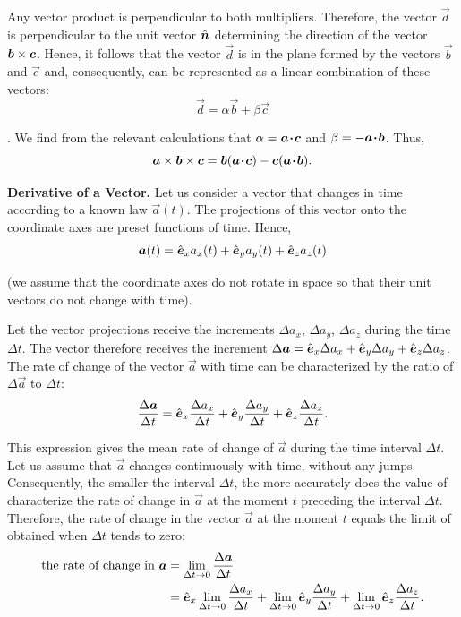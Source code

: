 \noindent
Any vector product is perpendicular to both multipliers. Therefore, the vector $\vec{d}$ is perpendicular to the unit vector $\hat{\boldsymbol{n}}$ determining the direction of the vector $\boldsymbol{b}\times\boldsymbol{c}$. Hence, it follows that the vector $\vec{d}$ is in the plane formed by the vectors $\vec{b}$ and $\vec{c}$ and, consequently, can be represented as a linear combination of these vectors:
\begin{equation*}
\vec{d} = \alpha\vec{b} + \beta\vec{c}
\end{equation*}

. We find from the relevant calculations that $\alpha=\boldsymbol{a\!\cdot\!c}$ and $\beta=-\boldsymbol{a\!\cdot\!b}$. Thus,
\begin{equation}\label{eq:1_35}
\boldsymbol{a}\times\boldsymbol{b}\times\boldsymbol{c} = \boldsymbol{b}(\boldsymbol{a\!\cdot\!c}) - \boldsymbol{c}(\boldsymbol{a\!\cdot\!b}).
\end{equation}

\textbf{Derivative of a Vector.} Let us consider a vector that changes in time according to a known law $\vec{a}(t)$. The projections of this vector onto the coordinate axes are preset functions of time. Hence,
\begin{equation}\label{eq:1_36}
\boldsymbol{a}(t) = \hat{\boldsymbol{e}}_{x}a_x(t) + \hat{\boldsymbol{e}}_{y}a_y(t) + \hat{\boldsymbol{e}}_{z}a_z(t)
\end{equation}

\noindent
(we assume that the coordinate axes do not rotate in space so that their unit vectors do not change with time).

Let the vector projections receive the increments $\Delta a_x$, $\Delta a_y$, $\Delta a_z$ during the time $\Delta t$. The vector therefore receives the increment $\Delta\boldsymbol{a} = \hat{\boldsymbol{e}}_{x}\Delta a_x + \hat{\boldsymbol{e}}_{y}\Delta a_y + \hat{\boldsymbol{e}}_{z}\Delta a_z$. The rate of change of the vector $\vec{a}$ with time can be characterized by the ratio of $\Delta\vec{a}$ to $\Delta t$:
\begin{equation}\label{eq:1_37}
\frac{\Delta\boldsymbol{a}}{\Delta t} = \hat{\boldsymbol{e}}_{x}\frac{\Delta a_x}{\Delta t} + \hat{\boldsymbol{e}}_{y}\frac{\Delta a_y}{\Delta t} + \hat{\boldsymbol{e}}_{z}\frac{\Delta a_z}{\Delta t}.
\end{equation}

\noindent
This expression gives the mean rate of change of $\vec{a}$ during the time interval $\Delta t$. Let us assume that $\vec{a}$ changes continuously with time, without any jumps. Consequently, the smaller the interval $\Delta t$, the more accurately does the value of  characterize the rate of change in $\vec{a}$ at the moment $t$ preceding the interval $\Delta t$. Therefore, the rate of change in the vector $\vec{a}$ at the moment $t$ equals the limit of  obtained when $\Delta t$ tends to zero:
\begin{align}
\text{the rate of change in }\boldsymbol{a} &= \lim_{\Delta t\to 0}\frac{\Delta\boldsymbol{a}}{\Delta t} \nonumber\\
&= \hat{\boldsymbol{e}}_{x} \lim_{\Delta t\to 0}\frac{\Delta a_x}{\Delta t} + \lim_{\Delta t\to 0}\hat{\boldsymbol{e}}_{y} \frac{\Delta a_y}{\Delta t} + \lim_{\Delta t\to 0}\hat{\boldsymbol{e}}_{z} \frac{\Delta a_z}{\Delta t}.\label{eq:1_38}
\end{align}

